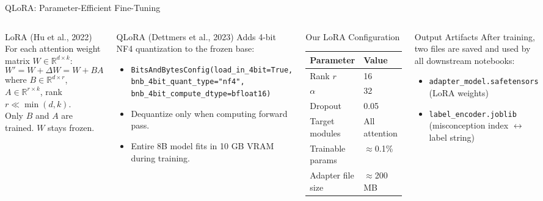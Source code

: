 ﻿\documentclass[aspectratio=169,10pt]{beamer}
\begin{document}
\begin{frame}[shrink=3]{QLoRA: Parameter-Efficient Fine-Tuning}
\begin{columns}[T]
\begin{block}{LoRA (Hu et al., 2022)}
For each attention weight matrix $W \in \mathbb{R}^{d\times k}$:
\[
  W' = W + \Delta W = W + BA
\]
where $B \in \mathbb{R}^{d\times r}$, $A \in \mathbb{R}^{r\times k}$, rank $r \ll \min(d,k)$.\\[6pt]
Only $B$ and $A$ are trained. $W$ stays frozen.
\end{block}
\vspace{6pt}
\begin{block}{QLoRA (Dettmers et al., 2023)}
Adds 4-bit NF4 quantization to the frozen base:
\begin{itemize}
  \item \texttt{BitsAndBytesConfig(load\_in\_4bit=True,}\\
        \texttt{\quad bnb\_4bit\_quant\_type="nf4",}\\
        \texttt{\quad bnb\_4bit\_compute\_dtype=bfloat16)}
  \item Dequantize only when computing forward pass.
  \item Entire 8B model fits in 10 GB VRAM during training.
\end{itemize}
\end{block}
\begin{block}{Our LoRA Configuration}
\begin{tabular}{ll}
\toprule
Parameter & Value\\
\midrule
Rank $r$ & 16\\
$\alpha$ & 32\\
Dropout & 0.05\\
Target modules & All attention\\
Trainable params & $\approx$0.1\%\\
Adapter file size & $\approx$200 MB\\
\bottomrule
\end{tabular}
\end{block}
\vspace{8pt}
\begin{exampleblock}{Output Artifacts}
After training, two files are saved and used by all downstream notebooks:
\begin{itemize}
  \item \texttt{adapter\_model.safetensors}\\(LoRA weights)
  \item \texttt{label\_encoder.joblib}\\(misconception index $\leftrightarrow$ label string)
\end{itemize}
\end{exampleblock}
\end{columns}
\end{frame}
\end{document}
